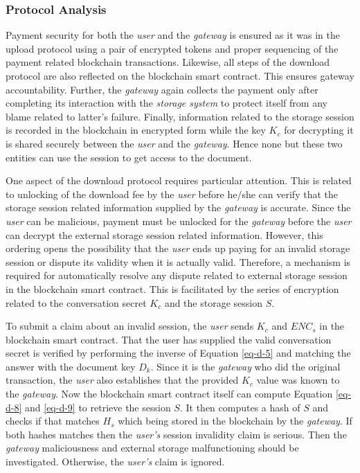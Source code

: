\subsubsection*{Protocol Analysis}
Payment security for both the {\it user} and the {\it gateway} is ensured as it was in the upload protocol using a pair of encrypted tokens and proper sequencing of the payment related blockchain transactions. Likewise, all steps of the download protocol are also reflected on the blockchain smart contract. This ensures gateway accountability. Further, the {\it gateway} again collects the payment only after completing its interaction with the {\it storage system} to protect itself from any blame related to latter's failure. Finally, information related to the storage session  is recorded in the blockchain in encrypted form while the key $K_c$ for decrypting it is shared securely between the {\it user} and the {\it gateway}. Hence none but these two entities can use the session to get access to the document.

One aspect of the download protocol requires particular attention. This is related to unlocking of the download fee by the {\it user} before he/she can verify that the storage session related information supplied by the {\it gateway} is accurate. Since the {\it user} can be malicious, payment must be unlocked for the {\it gateway} before the {\it user} can decrypt the external storage session related information. However, this ordering opens the possibility that the {\it user} ends up paying for an invalid storage session or dispute its validity when it is actually valid. Therefore, a mechanism is required for automatically resolve any dispute related to external storage session in the blockchain smart contract. This is facilitated by the series of encryption related to the conversation secret $K_c$ and the storage session $S$.

To submit a claim about an invalid session, the {\it user} sends $K_c$ and $ENC_s$ in the blockchain smart contract. That the user has supplied the valid conversation secret is verified by performing the inverse of Equation \ref{eq-d-5} and matching the answer with the document key $D_k$. Since it is the {\it gateway} who did the original transaction, the {\it user} also establishes that the provided $K_c$ value was known to the {\it gateway}. Now the blockchain smart contract itself can compute Equation \ref{eq-d-8} and \ref{eq-d-9} to retrieve the session $S$. It then computes a hash of $S$ and checks if that matches $H_s$ which being stored in the blockchain by the {\it gateway}. If both hashes matches then the {\it user's} session invalidity claim is serious. Then the {\it gateway} maliciousness and external storage  malfunctioning should be investigated. Otherwise, the {\it user's} claim is ignored.          

